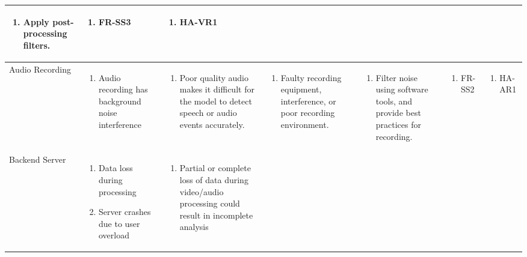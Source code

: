 \documentclass{article}
\begin{document}
\begin{landscape}
\begin{longtable}{|p{3cm}|p{3cm}|p{4cm}|p{4cm}|p{3cm}|p{2cm}|p{3cm}|}
\begin{enumerate}[leftmargin=*]
       \item Apply post-processing filters.
  \end{enumerate} &
  \begin{enumerate}[leftmargin=*]
       \item FR-SS3
  \end{enumerate} &
  \begin{enumerate}[leftmargin=*]
       \item HA-VR1
  \end{enumerate} \\
  \hline
  Audio Recording  & 
  \begin{enumerate}[leftmargin=*]
      \item Audio recording has background noise interference
  \end{enumerate} & 
  \begin{enumerate}[leftmargin=*]
      \item Poor quality audio makes it difficult for the model to detect speech or audio events accurately.
  \end{enumerate} &
  \begin{enumerate}[leftmargin=*]
       \item Faulty recording equipment, interference, or poor recording environment.
  \end{enumerate} &
  \begin{enumerate}[leftmargin=*]
       \item Filter noise using software tools, and provide best practices for recording.
  \end{enumerate} &
  \begin{enumerate}[leftmargin=*]
       \item FR-SS2
  \end{enumerate} &
  \begin{enumerate}[leftmargin=*]
       \item HA-AR1
  \end{enumerate} \\
  \hline
  Backend Server & 
  \begin{enumerate}[leftmargin=*]
      \item Data loss during processing
      \item Server crashes due to user overload
  \end{enumerate} & 
  \begin{enumerate}[leftmargin=*]
      \item Partial or complete loss of data during video/audio processing could result in incomplete analysis

\end{enumerate}
\end{longtable}
\end{landscape}
\end{document}
